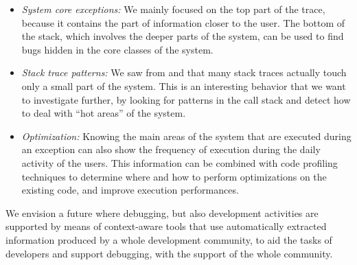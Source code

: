 \begin{itemize}%

\item\textit{System core exceptions:} We mainly focused on the top part of the trace, because it contains the part of information closer to the user.
The bottom of the stack, which involves the deeper parts of the system, can be used to find bugs hidden in the core classes of the system.

\item\textit{Stack trace patterns:} We saw from  and  that many stack traces actually touch only a small part of the system.
This is an interesting behavior that we want to investigate further, by looking for patterns in the call stack and detect how to deal with ``hot areas'' of the system.

\item\textit{Optimization:} Knowing the main areas of the system that are executed during an exception can also show the frequency of execution during the daily activity of the users.
This information can be combined with code profiling techniques to determine where and how to perform optimizations on the existing code, and improve execution performances.
\end{itemize}

We envision a future where debugging, but also development activities are supported by means of context-aware tools that use automatically extracted information produced by a whole development community, to aid the tasks of developers and support debugging, with the support of the whole community.

